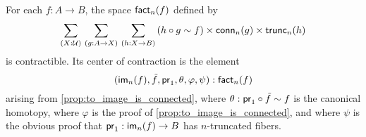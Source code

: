 \documentclass[hott-all.tex]{subfiles}
\begin{document}
% 
% 
% 
\begin{thm}
For each $f:A\to B$, the space $\mathsf{fact}_n(f)$ defined by
\begin{equation*}
\sm{X:\type}{g:A\to X}{h:X\to B} (h\circ g\htpy f)\times\mathsf{conn}_n(g)\times\mathsf{trunc}_n(h)
\end{equation*}
is contractible.
Its center of contraction is the element
\begin{equation*}
{\mathopen{}(\ensuremath{\mathsf{im}}_n(f),\tilde{f},\ensuremath{\mathsf{pr}_{1}},\theta,\varphi,\psi)\mathclose{}}:\mathsf{fact}_n(f)
\end{equation*}
arising from \cref{prop:to_image_is_connected},
where $\theta:\mathsf{pr}_{1}\circ\tilde{f}\sim f$ is the canonical homotopy, where $\varphi$ is the proof of
\cref{prop:to_image_is_connected}, and where $\psi$ is the obvious proof that $\mathsf{pr}_{1}:\mathsf{im}_n(f)\to B$ has $n$-truncated fibers.
\end{thm}
% 
\end{document}
